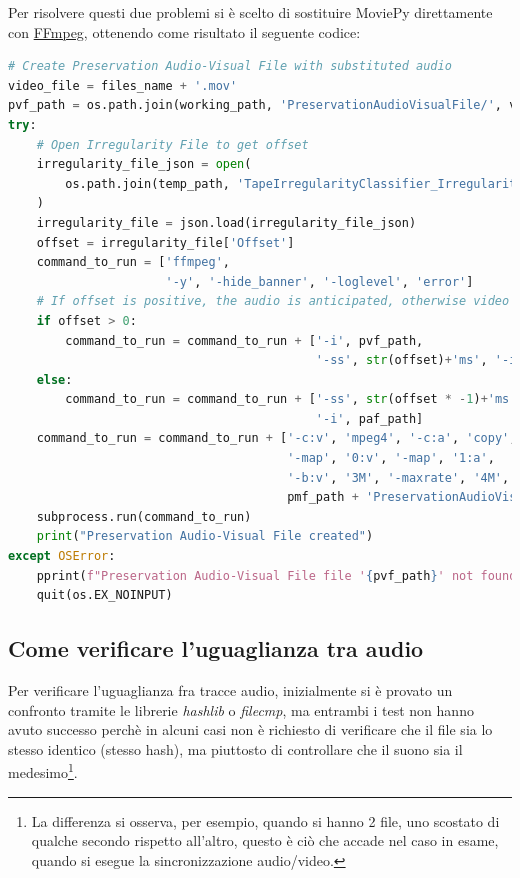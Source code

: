 Per risolvere questi due problemi si è scelto di sostituire MoviePy direttamente con \href{https://ffmpeg.org/}{FFmpeg}, ottenendo come risultato il seguente codice:
\begin{lstlisting}[language=Python, caption={Codice finale, creazione PreservationAudioVisualFile}]
# Create Preservation Audio-Visual File with substituted audio
video_file = files_name + '.mov'
pvf_path = os.path.join(working_path, 'PreservationAudioVisualFile/', video_file)
try:
    # Open Irregularity File to get offset
    irregularity_file_json = open(
        os.path.join(temp_path, 'TapeIrregularityClassifier_IrregularityFileOutput2.json')
    )
    irregularity_file = json.load(irregularity_file_json)
    offset = irregularity_file['Offset']
    command_to_run = ['ffmpeg',
                      '-y', '-hide_banner', '-loglevel', 'error']
    # If offset is positive, the audio is anticipated, otherwise video is anticipated (through seek)
    if offset > 0:
        command_to_run = command_to_run + ['-i', pvf_path,
                                           '-ss', str(offset)+'ms', '-i', paf_path]
    else:
        command_to_run = command_to_run + ['-ss', str(offset * -1)+'ms', '-i', pvf_path,
                                           '-i', paf_path]
    command_to_run = command_to_run + ['-c:v', 'mpeg4', '-c:a', 'copy',
                                       '-map', '0:v', '-map', '1:a',
                                       '-b:v', '3M', '-maxrate', '4M', '-bufsize', '4M',
                                       pmf_path + 'PreservationAudioVisualFile.mov']
    subprocess.run(command_to_run)
    print("Preservation Audio-Visual File created")
except OSError:
    pprint(f"Preservation Audio-Visual File file '{pvf_path}' not found!", color=Color.RED)
    quit(os.EX_NOINPUT)
\end{lstlisting}


\subsection{Come verificare l'uguaglianza tra audio} \label{ssec:packager-audio}    %
Per verificare l'uguaglianza fra tracce audio, inizialmente si è provato un confronto tramite le librerie \textit{hashlib} o \textit{filecmp}, ma entrambi i test non hanno avuto successo perchè in alcuni casi non è richiesto di verificare che il file sia lo stesso identico (stesso hash), ma piuttosto di controllare che il suono sia il medesimo\footnote{La differenza si osserva, per esempio, quando si hanno 2 file, uno scostato di qualche secondo rispetto all'altro, questo è ciò che accade nel caso in esame, quando si esegue la sincronizzazione audio/video.}.

